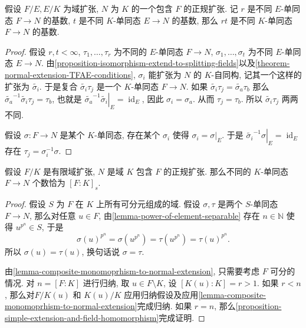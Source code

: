 \begin{lemma}
  \label{lemma-composite-monomoprhism-to-normal-extension}
  假设 \( F/E, E/K \) 为域扩张, \( N \) 为 \( K \) 的一个包含 \( F \)
  的正规扩张.
  记 \( r \) 是不同 \( E \)-单同态 \( F \to N \) 的基数, \( t \) 是不同 \( K
  \)-单同态 \( E \to N \) 的基数, 那么 \( rt \) 是不同 \( K \)-单同态 \( F \to N
  \) 的基数.
\end{lemma}
\begin{proof}
  假设 \( r, t < \infty \), \( \tau_1, \ldots, \tau_r \) 为不同的 \( E \)-单同态
  \( F \to N \), \( \sigma_1, \ldots, \sigma_t \) 为不同 \( E \)-单同态 \( E \to
  N\).
  由\cref{proposition-isomorphism-extend-to-splitting-fields}以及\cref{theorem-normal-extension-TFAE-conditions},
  \( \sigma_i \) 能扩张为 \( N \) 的 \( K \)-自同构, 记其一个这样的扩张为 \(
  \widetilde{\sigma_i} \).
  于是复合 \( \widetilde{\sigma_i}\tau_j \) 是一个 \( K \)-单同态 \( F \to N \).
  如果 \( \widetilde{\sigma_i} \tau_j = \widetilde{\sigma_a} \tau_b \) 那么 \(
  \widetilde{\sigma_a}^{-1} \widetilde{\sigma_i} \tau_j = \tau_b \), 也就是 \(
  \left. \widetilde{\sigma_a}^{-1} \widetilde{\sigma_i} \right\vert_{E} =
    \operatorname{id}_E \), 因此 \( \sigma_i = \sigma_a \).
  从而 \( \tau_j = \tau_b \). 所以 \( \widetilde{\sigma_i}\tau_j \) 两两不同.

  假设 \( \sigma: F \to N \) 是某个 \( K \)-单同态, 存在某个 \( \sigma_i \) 使得
  \( \sigma_i = \left. \sigma \right\vert_{E} \).
  于是 \( \left. \widetilde{\sigma_i}^{-1} \sigma \right\vert_E =
    \operatorname{id}_E \) 存在 \( \tau_j = \sigma_i^{-1} \sigma \).
\end{proof}

\begin{proposition}
  \label{proposition-separable-degree}
  假设 \( F/K \) 是有限域扩张, \( N \) 是域 \( K \) 包含 \( F \) 的正规扩张.
  那么不同的 \( K \)-单同态 \( F \to N \) 个数恰为 \( [F:K]_s \).
\end{proposition}
\begin{proof}
  假设 \( S \) 为 \( F \) 在 \( K \) 上所有可分元组成的域.
  假设 \( \sigma, \tau \) 是两个 \( S \)-单同态 \( F \to N \), 那么对任意 \( u
  \in F \), 由\cref{lemma-power-of-element-separable} 存在 \( n \in \mathbb{N}
  \) 使得 \( u^{p^n} \in S \), 于是
  \[
    \sigma(u)^{p^n} = \sigma(u^{p^n}) = \tau(u^{p^n}) = \tau(u)^{p^n}.
  \]
  所以 \( \sigma(u) = \tau(u) \), 换句话说 \( \sigma = \tau \).

  由\cref{lemma-composite-monomoprhism-to-normal-extension}, 只需要考虑 \( F \)
  可分的情况.
  对 \( n = [F:K] \) 进行归纳, 取 \( u \in F \setminus K \), 设 \( [K(u):K] = r
  > 1 \).
  如果 \( r < n \),
  那么对\( F/K(u) \) 和 \( K(u)/K \)
  应用归纳假设及应用\cref{lemma-composite-monomoprhism-to-normal-extension}完成归纳.
  如果 \( r = n \),
  那么\cref{proposition-simple-extension-and-field-homomorphism}完成证明.
\end{proof}

